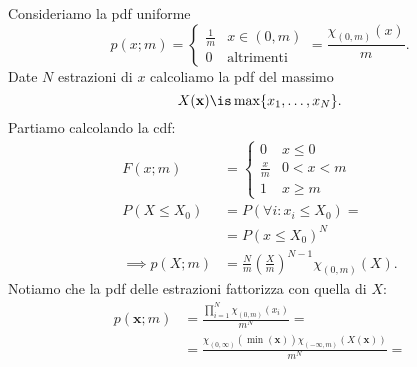 
\begin{example}
	Consideriamo la pdf uniforme
	\begin{equation*}
		p(x;m) = \begin{cases}
			\frac1m & x\in(0,m) \\
			0 & \text{altrimenti}
		\end{cases}
		= \frac{\chi_{(0,m)}(x)}m.
	\end{equation*}
	Date $N$ estrazioni di $x$ calcoliamo la pdf del massimo
	\begin{equation*}
		X(\mathbf x) \is \max\{x_1,\dotsc,x_N\}.
	\end{equation*}
	Partiamo calcolando la cdf:
	\begin{align*}
		F(x;m) &= \begin{cases}
			0 & x \le 0 \\
			\frac xm & 0 < x < m \\
			1 & x \ge m
		\end{cases} \\
		P(X\le X_0)
		&= P(\forall i:x_i\le X_0) = \\
		&= P(x \le X_0)^N \\
		\implies
		p(X;m) &= \frac Nm \left( \frac Xm \right)^{N-1} \chi_{(0,m)}(X).
	\end{align*}
	Notiamo che la pdf delle estrazioni fattorizza con quella di $X$:
	\begin{align*}
		p(\mathbf x;m)
		&= \frac{\prod_{i=1}^N \chi_{(0,m)}(x_i)}{m^N} = \\
		&= \frac{\chi_{(0,\infty)}(\min(\mathbf x))\chi_{(-\infty,m)}(X(\mathbf x))}{m^N} = 
	\end{align*}
\end{example}
